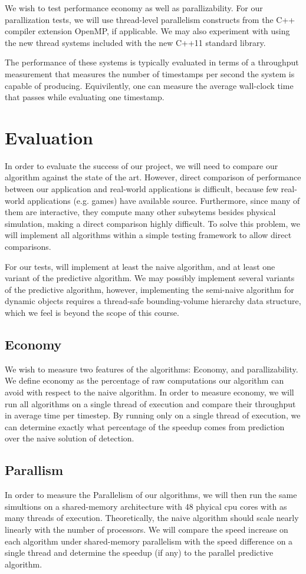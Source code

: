 \documentclass{article}
\begin{document}
We wish to test performance economy as well as parallizability.  For our parallization tests, we will use thread-level parallelism constructs from the C++ compiler
extension OpenMP, if applicable.  We may also experiment with using the new thread systems included with the new C++11 standard library.

The performance of these systems is typically evaluated in terms of a throughput measurement that measures the number of timestamps
per second the system is capable of producing.  Equivilently, one can measure the average wall-clock time that passes while evaluating one timestamp.
\section*{Evaluation}

In order to evaluate the success of our project, we will need to compare our algorithm against the state of the art.  However, direct comparison of performance between our application
and real-world applications is difficult, because few real-world applications (e.g. games) have available source.  Furthermore, since many of them
are interactive, they compute many other subsytems besides physical simulation, making a direct comparison highly difficult.  To solve this problem, we will implement all algorithms within a simple testing framework to allow direct comparisons.

For our tests, will implement at least the naive algorithm, and at least one variant of the predictive algorithm.  We may possibly implement several variants of the predictive algorithm, however, implementing the semi-naive algorithm for dynamic objects requires a thread-safe bounding-volume hierarchy data structure, which we feel is beyond the scope of this course.

\subsection*{Economy}
We wish to measure two features of the algorithms: Economy, and parallizability.  We define economy as the percentage of raw computations
our algorithm can avoid with respect to the naive algorithm.  In order to measure economy, we will run all algorithms on a single thread of execution
and compare their throughput in average time per timestep.  By running only on a single thread of execution, we can determine exactly
what percentage of the speedup comes from prediction over the naive solution of detection.
\subsection*{Parallism}
In order to measure the Parallelism of our algorithms, we will then run the same simultions on a shared-memory architecture with 48 phyical cpu cores with as many threads of execution.
Theoretically, the naive algorithm should scale nearly linearly with the number of processors.  We will compare the speed increase on each algorithm under shared-memory parallelism with the speed difference on a single thread and determine the speedup (if any) to the parallel predictive algorithm.
\end{document}
